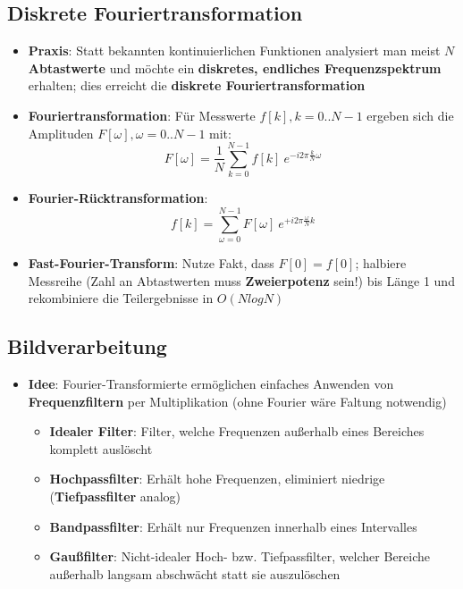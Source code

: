 \newpage
\subsection{Diskrete Fouriertransformation}%
\label{four:sub:diskrete_fouriertransformation}

\begin{itemize}
	\item \textbf{Praxis}: Statt bekannten kontinuierlichen Funktionen analysiert man meist $N$ \textbf{Abtastwerte} und möchte ein \textbf{diskretes, endliches Frequenzspektrum} erhalten; dies erreicht die \textbf{diskrete Fouriertransformation}
	\item \textbf{Fouriertransformation}: Für Messwerte $f[k], k = 0..N-1$ ergeben sich die Amplituden $F[\omega], \omega = 0..N-1$ mit:
	$$F[\omega] = \frac{1}{N}\sum^{N-1}_{k=0}f[k]\ e^{-i2\pi\frac{k}{N}\omega}$$
	\item \textbf{Fourier-Rücktransformation}:
	$$f[k] = \sum^{N-1}_{\omega=0}F[\omega]\ e^{+i2\pi\frac{\omega}{N}k}$$
	\item \textbf{Fast-Fourier-Transform}: Nutze Fakt, dass $F[0] = f[0]$; halbiere Messreihe (Zahl an Abtastwerten muss \textbf{Zweierpotenz} sein!) bis Länge 1 und rekombiniere die Teilergebnisse in $O(N log N)$
\end{itemize}

\subsection{Bildverarbeitung}%
\label{four:sub:bildverarbeitung}

\begin{itemize}
	\item \textbf{Idee}: Fourier-Transformierte ermöglichen einfaches Anwenden von \textbf{Frequenzfiltern} per Multiplikation (ohne Fourier wäre Faltung notwendig)
	\begin{itemize}
		\item \textbf{Idealer Filter}: Filter, welche Frequenzen außerhalb eines Bereiches komplett auslöscht
		\item \textbf{Hochpassfilter}: Erhält hohe Frequenzen, eliminiert niedrige (\textbf{Tiefpassfilter} analog)
		\item \textbf{Bandpassfilter}: Erhält nur Frequenzen innerhalb eines Intervalles
		\item \textbf{Gaußfilter}: Nicht-idealer Hoch- bzw. Tiefpassfilter, welcher Bereiche außerhalb langsam abschwächt statt sie auszulöschen
	\end{itemize}
\end{itemize}

